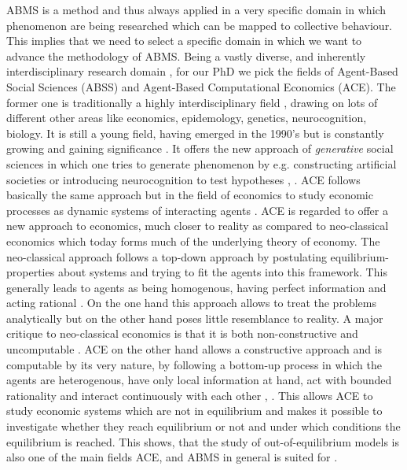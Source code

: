 ABMS is a method and thus always applied in a very specific domain in which phenomenon are being researched which can be mapped to collective behaviour. This implies that we need to select a specific domain in which we want to advance the methodology of ABMS. Being a vastly diverse, and inherently interdisciplinary research domain \cite{niazi_agent-based_2011}, for our PhD we pick the fields of Agent-Based Social Sciences (ABSS) and Agent-Based Computational Economics (ACE). The former one is traditionally a highly interdisciplinary field \cite{axelrod_chapter_2006}, drawing on lots of different other areas like economics, epidemology, genetics, neurocognition, biology. It is still a young field, having emerged in the 1990's but is constantly growing and gaining significance \cite{axelrod_advancing_1997}. It offers the new approach of \textit{generative} social sciences in which one tries to generate phenomenon by e.g. constructing artificial societies or introducing neurocognition to test hypotheses \cite{epstein_growing_1996}, \cite{epstein_agent_zero:_2014}.
ACE follows basically the same approach but in the field of economics to study economic processes as dynamic systems of interacting agents \cite{tesfatsion_agent-based_2006}. ACE is regarded to offer a new approach to economics, much closer to reality as compared to neo-classical economics which today forms much of the underlying theory of economy. The neo-classical approach follows a top-down approach by postulating equilibrium-properties about systems and trying to fit the agents into this framework. This generally leads to agents as being homogenous, having perfect information and acting rational \cite{kirman_complex_2010}. On the one hand this approach allows to treat the problems analytically but on the other hand poses little resemblance to reality. A major critique to neo-classical economics is that it is both non-constructive and uncomputable \cite{velupillai_unreasonable_2005}.
ACE on the other hand allows a constructive approach and is computable by its very nature, by following a bottom-up process in which the agents are heterogenous, have only local information at hand, act with bounded rationality and interact continuously with each other \cite{tesfatsion_modeling_2017}, \cite{kirman_complex_2010}. This allows ACE to study economic systems which are not in equilibrium and makes it possible to investigate whether they reach equilibrium or not and under which conditions the equilibrium is reached. This shows, that the study of out-of-equilibrium models is also one of the main fields ACE, and ABMS in general is suited for \cite{epstein_generative_2012}.


